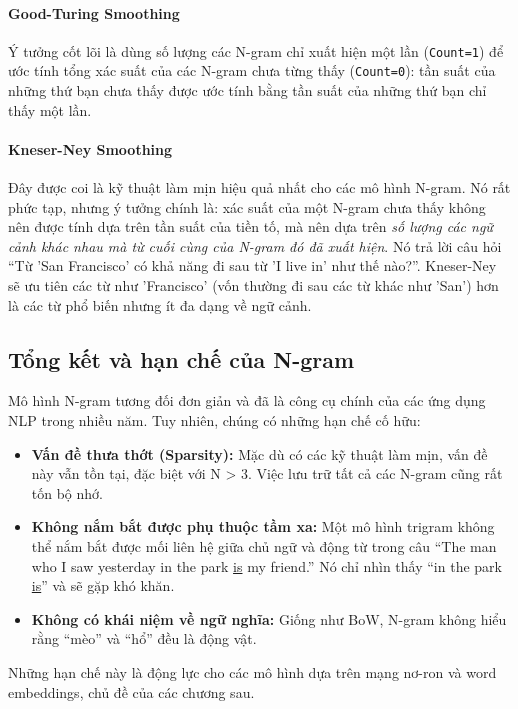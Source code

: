 \paragraph{Good-Turing Smoothing}
Ý tưởng cốt lõi là dùng số lượng các N-gram chỉ xuất hiện một lần (\texttt{Count=1}) để ước tính tổng xác suất của các N-gram chưa từng thấy (\texttt{Count=0}): tần suất của những thứ bạn chưa thấy được ước tính bằng tần suất của những thứ bạn chỉ thấy một lần.

\paragraph{Kneser-Ney Smoothing}
Đây được coi là kỹ thuật làm mịn hiệu quả nhất cho các mô hình N-gram. Nó rất phức tạp, nhưng ý tưởng chính là: xác suất của một N-gram chưa thấy không nên được tính dựa trên tần suất của tiền tố, mà nên dựa trên \textit{số lượng các ngữ cảnh khác nhau mà từ cuối cùng của N-gram đó đã xuất hiện}. Nó trả lời câu hỏi “Từ 'San Francisco' có khả năng đi sau từ 'I live in' như thế nào?”. Kneser-Ney sẽ ưu tiên các từ như 'Francisco' (vốn thường đi sau các từ khác như 'San') hơn là các từ phổ biến nhưng ít đa dạng về ngữ cảnh.

\subsection{Tổng kết và hạn chế của N-gram}
Mô hình N-gram tương đối đơn giản và đã là công cụ chính của các ứng dụng NLP trong nhiều năm. Tuy nhiên, chúng có những hạn chế cố hữu:
\begin{itemize}
    \item \textbf{Vấn đề thưa thớt (Sparsity):} Mặc dù có các kỹ thuật làm mịn, vấn đề này vẫn tồn tại, đặc biệt với N > 3. Việc lưu trữ tất cả các N-gram cũng rất tốn bộ nhớ.
    \item \textbf{Không nắm bắt được phụ thuộc tầm xa:} Một mô hình trigram không thể nắm bắt được mối liên hệ giữa chủ ngữ và động từ trong câu “The man who I saw yesterday in the park \underline{is} my friend.” Nó chỉ nhìn thấy “in the park \underline{is}” và sẽ gặp khó khăn.
    \item \textbf{Không có khái niệm về ngữ nghĩa:} Giống như BoW, N-gram không hiểu rằng “mèo” và “hổ” đều là động vật.
\end{itemize}

Những hạn chế này là động lực cho các mô hình dựa trên mạng nơ-ron và word embeddings, chủ đề của các chương sau.
